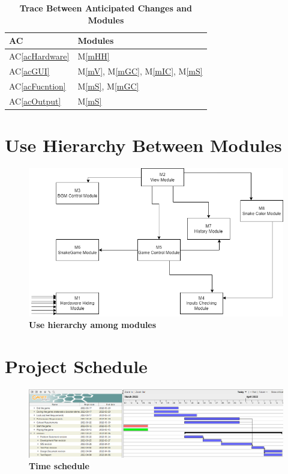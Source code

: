 \documentclass[12pt, titlepage]{article}
\newcommand{\acref}[1]{AC\ref{#1}}
\newcommand{\mref}[1]{M\ref{#1}}
\begin{document}
\begin{table}[H]
\centering
\begin{tabular}{p{} p{}}
\toprule
\textbf{AC} & \textbf{Modules}\\
\midrule
\acref{acHardware} & \mref{mHH}\\
\acref{acGUI} & \mref{mV}, \mref{mGC}, \mref{mIC}, \mref{mS}\\
\acref{acFucntion} & \mref{mS}, \mref{mGC}\\
\acref{acOutput} & \mref{mS}\\
\bottomrule
\end{tabular}
\caption{\textbf{Trace Between Anticipated Changes and Modules}}
\label{TblACT}
\end{table}

\section{Use Hierarchy Between Modules} \label{SecUse}
\begin{figure}[H]
\centering
\includegraphics[width=1.0\textwidth]{./Figures/UHBM.png}
\caption{\textbf{Use hierarchy among modules}}
\label{FigUH}
\end{figure}

\section{Project Schedule} \label{SecPS}
\begin{figure}[H]
\centering
\includegraphics[width=1.0\textwidth]{./Figures/gantt.png}
\caption{\textbf{Time schedule}}
\label{FigUH}
\end{figure}
\end{document}
